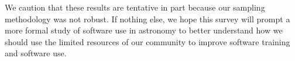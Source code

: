 We caution that these results are tentative in part because our sampling methodology was not robust.  If nothing else, we hope this survey will prompt a more formal study of software use in astronomy to better understand how we should use the limited resources of our community to improve software training and software use.

